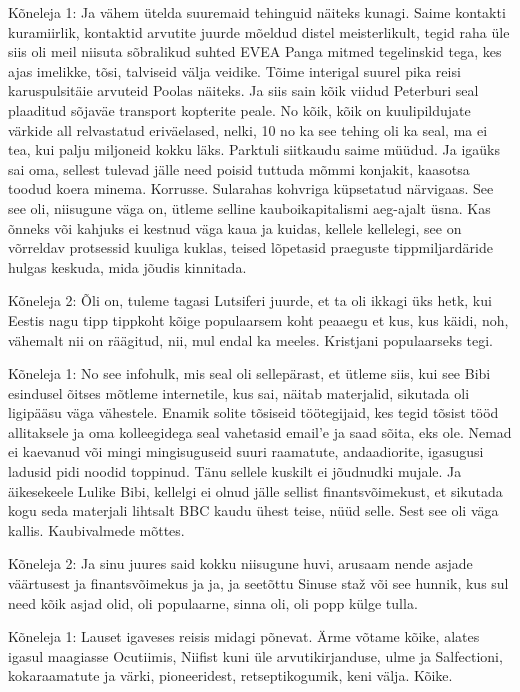 Kõneleja 1:
Ja vähem ütelda suuremaid tehinguid näiteks kunagi.
Saime kontakti kuramiirlik, kontaktid arvutite juurde mõeldud distel meisterlikult, tegid raha üle siis oli meil niisuta sõbralikud suhted EVEA Panga mitmed tegelinskid tega, kes ajas imelikke, tõsi, talviseid välja veidike. Tõime interigal suurel pika reisi karuspulsitäie arvuteid Poolas näiteks. Ja siis sain kõik viidud Peterburi seal plaaditud sõjaväe transport kopterite peale. No kõik, kõik on kuulipildujate värkide all relvastatud eriväelased, nelki, 10 no ka see tehing oli ka seal, ma ei tea, kui palju miljoneid kokku läks.
Parktuli siitkaudu saime müüdud. Ja igaüks sai oma, sellest tulevad jälle need poisid tuttuda mõmmi konjakit, kaasotsa toodud koera minema. Korrusse.
Sularahas kohvriga küpsetatud närvigaas.
See see oli, niisugune väga on, ütleme selline kauboikapitalismi aeg-ajalt üsna.
Kas õnneks või kahjuks ei kestnud väga kaua ja kuidas, kellele kellelegi, see on võrreldav protsessid kuuliga kuklas, teised lõpetasid praeguste tippmiljardäride hulgas keskuda, mida jõudis kinnitada.
                 
Kõneleja 2:
Õli on, tuleme tagasi Lutsiferi juurde, et ta oli ikkagi üks hetk, kui Eestis nagu tipp tippkoht kõige populaarsem koht peaaegu et kus, kus käidi, noh, vähemalt nii on räägitud, nii, mul endal ka meeles. Kristjani populaarseks tegi.
                 
Kõneleja 1:
No see infohulk, mis seal oli sellepärast, et ütleme siis, kui see Bibi esindusel õitses mõtleme internetile, kus sai, näitab materjalid, sikutada oli ligipääsu väga vähestele. Enamik solite tõsiseid töötegijaid, kes tegid tõsist tööd allitaksele ja oma kolleegidega seal vahetasid email'e ja saad sõita, eks ole. Nemad ei kaevanud või mingi mingisuguseid suuri raamatute, andaadiorite, igasugusi ladusid pidi noodid toppinud. Tänu sellele kuskilt ei jõudnudki mujale. Ja äikesekeele Lulike Bibi, kellelgi ei olnud jälle sellist finantsvõimekust, et sikutada kogu seda materjali lihtsalt BBC kaudu ühest teise, nüüd selle. Sest see oli väga kallis. Kaubivalmede mõttes.
                 
Kõneleja 2:
Ja sinu juures said kokku niisugune huvi, arusaam nende asjade väärtusest ja finantsvõimekus ja ja, ja seetõttu Sinuse staž või see hunnik, kus sul need kõik asjad olid, oli populaarne, sinna oli, oli popp külge tulla.
                 
Kõneleja 1:
Lauset igaveses reisis midagi põnevat. Ärme võtame kõike, alates igasul maagiasse Ocutiimis, Niifist kuni üle arvutikirjanduse, ulme ja Salfectioni, kokaraamatute ja värki, pioneeridest, retseptikogumik, keni välja. Kõike.
                 

